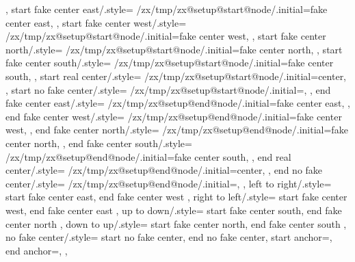{{{      %
    },
    start fake center east/.style={%
      /zx/tmp/zx@setup@start@node/.initial=fake center east,
    },
    start fake center west/.style={%
      /zx/tmp/zx@setup@start@node/.initial=fake center west,
    },
    start fake center north/.style={%
      /zx/tmp/zx@setup@start@node/.initial=fake center north,
    },
    start fake center south/.style={%
      /zx/tmp/zx@setup@start@node/.initial=fake center south,
    },
    start real center/.style={
      /zx/tmp/zx@setup@start@node/.initial=center,
    },
    start no fake center/.style={
      /zx/tmp/zx@setup@start@node/.initial=,
    },
    end fake center east/.style={%
      /zx/tmp/zx@setup@end@node/.initial=fake center east,
    },
    end fake center west/.style={%
      /zx/tmp/zx@setup@end@node/.initial=fake center west,
    },
    end fake center north/.style={%
      /zx/tmp/zx@setup@end@node/.initial=fake center north,
    },
    end fake center south/.style={%
      /zx/tmp/zx@setup@end@node/.initial=fake center south,
    },
    end real center/.style={
      /zx/tmp/zx@setup@end@node/.initial=center,
    },
    end no fake center/.style={
      /zx/tmp/zx@setup@end@node/.initial=,
    },
    left to right/.style={
      start fake center east,
      end fake center west
    },
    right to left/.style={
      start fake center west,
      end fake center east
    },
    up to down/.style={
      start fake center south,
      end fake center north
    },
    down to up/.style={
      start fake center north,
      end fake center south
    },
    no fake center/.style={
      start no fake center,
      end no fake center,
      start anchor=,
      end anchor=,
    },
}}
